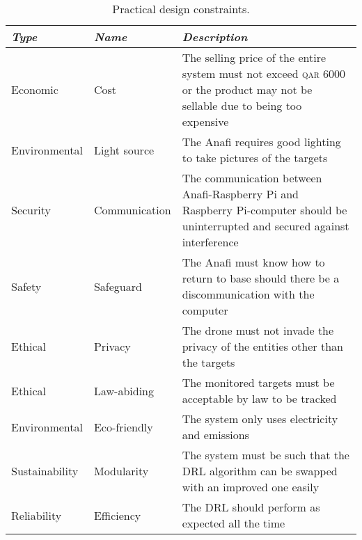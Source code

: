 \documentclass[../main.tex]{subfiles}
\begin{document}
\begin{table}[hbt!]
    \centering
    \caption{Practical design constraints.}
    \label{tab:practical-design-constraints}
    \begin{tabular}{ P{3cm} P{3cm} P{9cm} }
        \toprule
        \textit{Type} 
            & \textit{Name} 
                & \textit{Description} \\

        \midrule
        
        Economic 
            & Cost 
                & The selling price of the entire system must 
                not exceed \textsc{qar} 6000 or the product
                may not be sellable due to being too expensive \\
        
        Environmental 
            & Light source 
                & The Anafi requires good lighting to 
                take pictures of the targets \\
        
        Security 
            & Communication 
                & The communication between Anafi-Raspberry Pi 
                and Raspberry Pi-computer should be uninterrupted 
                and secured against interference \\
        
        Safety 
            & Safeguard 
                & The Anafi must know how to return to base 
                should there be a discommunication with the computer \\
        
        Ethical 
            & Privacy 
                & The drone must not invade the privacy of 
                the entities other than the targets \\
        
        Ethical 
            & Law-abiding 
                & The monitored targets must be acceptable 
                by law to be tracked \\
        
        Environmental 
            & Eco-friendly 
                & The system only uses electricity and emissions \\
        
        Sustainability 
            & Modularity 
                & The system must be such that the DRL algorithm can be swapped with an improved one easily \\
        
        Reliability 
            & Efficiency 
                & The DRL should perform as expected all the time \\

        \bottomrule		
    \end{tabular}
\end{table}
\end{document}
